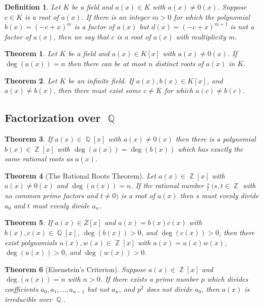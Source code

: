 \documentclass[letterpaper, 12pt]{article}
\DeclareMathOperator{\Z}{\mathbb{Z}}
\DeclareMathOperator{\Q}{\mathbb{Q}}
\newtheorem{defn}{Definition}
\newtheorem{thm}{Theorem}
\begin{document}
			\setcounter{defn}{25}
			\begin{defn}
			Let $K$ be a field and $a(x) \in K$ with $a(x) \neq 0(x)$. 
			Suppose $c \in K$ is a root of $a(x)$. 
			If there is an integer $m > 0$ for which the polynomial $b(x) = (-c +x)^{m}$ is a factor of $a(x)$ but $d(x) = (-c + x)^{m+1}$ is not a factor of $a(x)$, then we say that $c$ is a root of $a(x)$ with multiplicity $m$.
			\end{defn}

			\setcounter{thm}{26}
			\begin{thm}
			Let $K$ be a field and $a(x) \in K[x]$ with $a(x) \neq 0(x)$. 
			If $\deg(a(x)) = n$ then there can be at most $n$ distinct roots of $a(x)$ in $K$.
			\end{thm}

			\begin{thm}
			Let $K$ be an infinite field. 
			If $a(x),b(x) \in K[x]$, and $a(x) \neq b(x)$, then there must exist some $c \neq K$ for which $a(c) \neq b(c).$
			\end{thm}

		\subsection{Factorization over $\Q$}
		\label{sec:factorization_over_q}
			\begin{thm}
			If $a(x) \in \Q[x]$ with $a(x) \neq 0(x)$ then there is a polynomial $b(x) \in \Z[x]$ with $\deg(a(x)) = \deg(b(x))$ which has exactly the same rational roots as $a(x)$.
			\end{thm}

			\setcounter{thm}{30}
			\begin{thm}[The Rational Roots Theorem]
			Let $a(x) \in \Z[x]$ with $a(x) \neq 0(x)$ and $\deg(a(x)) = n$. 
			If the rational number $\frac{s}{t} \ (s,t \in \Z$ with no common prime factors and $t \neq 0)$ is a root of $a(x)$ then $s$ must evenly divide $a_{0}$ and $t$ must evenly divide $a_{n}$.
			\end{thm}

			\setcounter{thm}{32}
			\begin{thm}
			If $a(x) \in Z[x]$ and $a(x) = b(x)c(x)$ with $b(x),c(x) \in \Q[x]$, $\deg(b(x)) > 0$, and $\deg(c(x)) > 0$, then there exist polynomials $u(x), w(x) \in \Z[x]$ with $a(x) = u(x)w(x)$, $\deg(u(x)) > 0$, and $\deg(w(x)) > 0$.
			\end{thm}

			\setcounter{thm}{34}
			\begin{thm}[Eisenstein's Criterion]
			Suppose $a(x) \in \Z[x]$ and $\deg(a(x)) = n$ with $n > 0$. 
			If there exists a prime number $p$ which divides coefficients $a_{0}, a_{1}, \dots, a_{n-1}$ but not $a_{n}$, and $p^{2}$ does not divide $a_{0}$, then $a(x)$ is irreducible over $\Q$.
			\end{thm}
\end{document}
